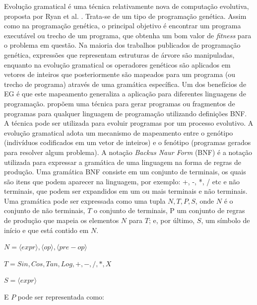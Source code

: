 Evolução gramatical é uma técnica relativamente nova de computação evolutiva, proposta por Ryan et al. \cite{ryan1998grammatical}. Trata-se de um tipo de programação genética. Assim como na programação genética, o principal objetivo é encontrar um programa executável ou trecho de um programa, que obtenha um bom valor de \textit{fitness} para o problema em questão. Na maioria dos trabalhos publicados de programação genética, expressões que representam estruturas de árvore são manipuladas, enquanto na evolução gramatical os operadores genéticos são aplicados em vetores de inteiros que posteriormente são mapeados para um programa (ou trecho de programa) através de uma gramática específica. Um dos benefícios de EG é que este mapeamento generaliza a aplicação para diferentes linguagens de programação. \cite{ryan1998grammatical} propõem uma técnica para gerar programas ou fragmentos de programas para qualquer linguagem de programação utilizando definições BNF. A técnica pode ser utilizada para evoluir programas por um processo evolutivo. A evolução gramatical adota um mecanismo de mapeamento entre o genótipo (indivíduos codificados em um vetor de inteiros) e o fenótipo (programas gerados para resolver algum problema). 
A notação \textit{Backus Naur Form} (BNF) é a notação utilizada para expressar a gramática de uma linguagem na forma de regras de produção. Uma gramática BNF consiste em um conjunto de terminais, os quais são itens que podem aparecer na linguagem, por exemplo: +, -, *, / etc e não terminais, que podem ser expandidos em um ou mais terminais e não terminais. Uma gramática pode ser expressada como uma tupla ${N,T,P,S}$, onde $N$ é o conjunto de não terminais, $T$ o conjunto de terminais, P um conjunto de regras de produção que mapeia os elementos $N$ para $T$; e, por último, $S$, um símbolo de início e que está contido em $N$.

\begin{center}
	
	$ N = {\langle expr \rangle, \langle op \rangle, \langle pre-op \rangle}$
	
	$ T = {Sin,Cos,Tan,Log,+,-,/,*,X} $
	
	$ S = \langle expr \rangle $
	
\end{center}

\noindent
E $P$ pode ser representada como:

